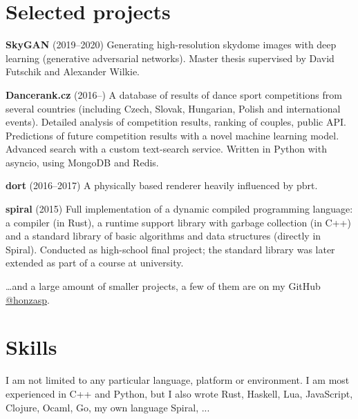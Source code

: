 \documentclass[11pt,a4paper]{article}
\begin{document}
\begin{multicols}{2}
\section*{Selected projects}

\textbf{SkyGAN} (2019–2020)
  \newline Generating high-resolution skydome images with deep learning
  (generative adversarial networks).
  \newline Master thesis supervised by David Futschik and Alexander Wilkie.

\textbf{Dancerank.cz} (2016–)
  \newline A database of results of dance sport competitions from several
  countries (including Czech, Slovak, Hungarian, Polish and international
  events).
  \newline Detailed analysis of competition results, ranking of couples, public API.
  \newline Predictions of future competition results with a novel machine learning model.
  \newline Advanced search with a custom text-search service.
  \newline Written in Python with asyncio, using MongoDB and Redis.

\textbf{dort} (2016–2017)
  \newline A physically based renderer heavily influenced by pbrt.

\textbf{spiral} (2015)
  \newline Full implementation of a dynamic compiled programming language: a
  compiler (in Rust), a runtime support library with garbage collection (in
  C++) and a standard library of basic algorithms and data structures
  (directly in Spiral).
  \newline Conducted as high-school final project; the standard library was
  later extended as part of a course at university.

\ldots{}and a large amount of smaller projects, a few of them are on my GitHub 
\href{https://github.com/honzasp}{@honzasp}.

\section*{Skills}

I am not limited to any particular language, platform or environment. I am most
experienced in C++ and Python, but I also wrote Rust,
{\small Haskell, Lua,}
{\footnotesize JavaScript,}
{\scriptsize Clojure, Ocaml, Go, my own language Spiral, ...}


\end{multicols}
\end{document}
